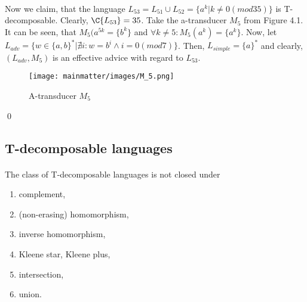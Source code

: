 \begin{enumerate}
\paragraph{}
Now we claim, that the language $L_{53} = L_{51} \cup L_{52} = \{a^k|k\neq 0 (mod 35)\}$ is T-decomposable. Clearly, $\C{L_{53}} = 35$. Take the a-transducer $M_5$ from Figure 4.1. It can be seen, that $M_5(a^{5k} = \{ b^k \}$ and $\forall k \neq 5: M_5(a^k) = \{ a^k \}$. Now, let $L_{adv} = \{ w \in \{a,b\}^* | \nexists i: w = b^i \wedge i = 0 (mod 7) \}$. Then, $L_{simple} = \{a\}^*$ and clearly, $(L_{adv},M_5)$ is an effective advice with regard to $L_{53}$.

\begin{figure}
\texttt{[image: mainmatter/images/M\_5.png]}
\caption{A-transducer $M_5$}
\end{figure}

\end{enumerate} \qed

\subsection{T-decomposable languages}

\paragraph{}
\cveta The class of T-decomposable languages is not closed under 
\begin{enumerate}
\item complement,
\item (non-erasing) homomorphism,
\item inverse homomorphism,
\item Kleene star, Kleene plus,
\item intersection,
\item union.
\end{enumerate}

